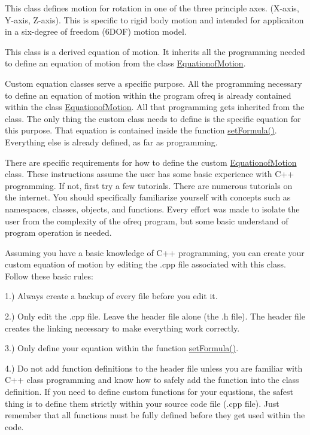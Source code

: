 This class defines motion for rotation in one of the three principle axes. (X-\/axis, Y-\/axis, Z-\/axis). This is specific to rigid body motion and intended for applicaiton in a six-\/degree of freedom (6\-D\-O\-F) motion model. 

 This class is a derived equation of motion. It inherits all the programming needed to define an equation of motion from the class \hyperlink{classosea_1_1ofreq_1_1_equationof_motion}{Equationof\-Motion}.

Custom equation classes serve a specific purpose. All the programming necessary to define an equation of motion within the program ofreq is already contained within the class \hyperlink{classosea_1_1ofreq_1_1_equationof_motion}{Equationof\-Motion}. All that programming gets inherited from the class. The only thing the custom class needs to define is the specific equation for this purpose. That equation is contained inside the function \hyperlink{classosea_1_1ofreq_1_1_eqn_rotation_a910975e9e2e8d438853a4e7d658850a8}{set\-Formula()}. Everything else is already defined, as far as programming.

There are specific requirements for how to define the custom \hyperlink{classosea_1_1ofreq_1_1_equationof_motion}{Equationof\-Motion} class. These instructions assume the user has some basic experience with C++ programming. If not, first try a few tutorials. There are numerous tutorials on the internet. You should specifically familiarize yourself with concepts such as namespaces, classes, objects, and functions. Every effort was made to isolate the user from the complexity of the ofreq program, but some basic understand of program operation is needed.

Assuming you have a basic knowledge of C++ programming, you can create your custom equation of motion by editing the .cpp file associated with this class. Follow these basic rules\-:

1.) Always create a backup of every file before you edit it.

2.) Only edit the .cpp file. Leave the header file alone (the .h file). The header file creates the linking necessary to make everything work correctly.

3.) Only define your equation within the function \hyperlink{classosea_1_1ofreq_1_1_eqn_rotation_a910975e9e2e8d438853a4e7d658850a8}{set\-Formula()}.

4.) Do not add function definitions to the header file unless you are familiar with C++ class programming and know how to safely add the function into the class definition. If you need to define custom functions for your equstions, the safest thing is to define them strictly within your source code file (.cpp file). Just remember that all functions must be fully defined before they get used within the code.

